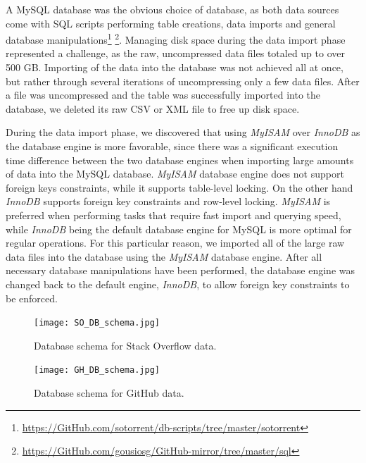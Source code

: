         A MySQL database was the obvious choice of database, as both data sources come with SQL scripts performing table creations, data imports and general database manipulations\footnote{\label{SO_sql} \url{https://GitHub.com/sotorrent/db-scripts/tree/master/sotorrent}} \footnote{\label{GH_sql} \url{https://GitHub.com/gousiosg/GitHub-mirror/tree/master/sql}}. Managing disk space during the data import phase represented a challenge, as the raw, uncompressed data files totaled up to over 500 GB. Importing of the data into the database was not achieved all at once, but rather through several iterations of uncompressing only a few data files. After a file was uncompressed and the table was successfully imported into the database, we deleted its raw CSV or XML file to free up disk space. 
        
        During the data import phase, we discovered that using \textit{MyISAM} over \textit{InnoDB} as the database engine is more favorable, since there was a significant execution time difference between the two database engines when importing large amounts of data into the MySQL database. \textit{MyISAM} database engine does not support foreign keys constraints, while it supports table-level locking. On the other hand \textit{InnoDB} supports foreign key constraints and row-level locking. \textit{MyISAM} is preferred when performing tasks that require fast import and querying speed, while \textit{InnoDB} being the default database engine for MySQL is more optimal for regular operations. For this particular reason, we imported all of the large raw data files into the database using the \textit{MyISAM} database engine. After all necessary database manipulations have been performed, the database engine was changed back to the default engine, \textit{InnoDB}, to allow foreign key constraints to be enforced. 
     
      
        \begin{figure}[!ht]
          \centering
          \texttt{[image: SO\_DB\_schema.jpg]}\\
          \caption{Database schema for Stack Overflow data.}
          \label{fig:so_schema}
        \end{figure}
        
 
        \begin{figure}[!ht]
          \centering
          \texttt{[image: GH\_DB\_schema.jpg]}\\
          \caption{Database schema for GitHub data.}
          \label{fig:gh_schema}
        \end{figure}
        
